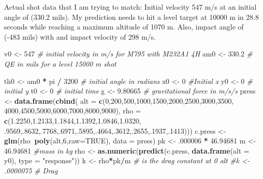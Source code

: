 \documentclass[
]{article}
\newenvironment{Shaded}{\begin{snugshade}}{\end{snugshade}}
\newcommand{\CommentTok}[1]{\textcolor[rgb]{0.56,0.35,0.01}{\textit{#1}}}
\newcommand{\DataTypeTok}[1]{\textcolor[rgb]{0.13,0.29,0.53}{#1}}
\newcommand{\DecValTok}[1]{\textcolor[rgb]{0.00,0.00,0.81}{#1}}
\newcommand{\FloatTok}[1]{\textcolor[rgb]{0.00,0.00,0.81}{#1}}
\newcommand{\KeywordTok}[1]{\textcolor[rgb]{0.13,0.29,0.53}{\textbf{#1}}}
\newcommand{\NormalTok}[1]{#1}
\newcommand{\OperatorTok}[1]{\textcolor[rgb]{0.81,0.36,0.00}{\textbf{#1}}}
\newcommand{\OtherTok}[1]{\textcolor[rgb]{0.56,0.35,0.01}{#1}}
\newcommand{\StringTok}[1]{\textcolor[rgb]{0.31,0.60,0.02}{#1}}
\begin{document}
Actual shot data that I am trying to match: Initial velocity 547 m/s at
an initial angle of (330.2 mils). My prediction needs to hit a level
target at 10000 m in 28.8 seconds while reaching a maximum altitude of
1070 m. Also, impact angle of (-483 mils) with and impact velocity of
298 m/s.

\begin{Shaded}
\begin{Highlighting}[]
\NormalTok{v0 <-}\StringTok{ }\DecValTok{547} \CommentTok{# initial velocity in m/s for M795 with M232A1 4H}
\NormalTok{am0 <-}\StringTok{ }\FloatTok{330.2} \CommentTok{# QE in mils for a level 15000 m shot}

\NormalTok{th0 <-}\StringTok{ }\NormalTok{am0 }\OperatorTok{*}\StringTok{ }\NormalTok{pi }\OperatorTok{/}\StringTok{ }\DecValTok{3200} \CommentTok{# initial angle in radians}
\NormalTok{x0 <-}\StringTok{ }\DecValTok{0} \CommentTok{#Initial x}
\NormalTok{y0 <-}\StringTok{ }\DecValTok{0} \CommentTok{# initial y}
\NormalTok{t0 <-}\StringTok{ }\DecValTok{0} \CommentTok{# initial time}
\NormalTok{g <-}\StringTok{ }\FloatTok{9.80665} \CommentTok{# gravitational force in m/s/s}
\NormalTok{press <-}\StringTok{ }\KeywordTok{data.frame}\NormalTok{(}\KeywordTok{cbind}\NormalTok{(}
  \DataTypeTok{alt =} \KeywordTok{c}\NormalTok{(}\DecValTok{0}\NormalTok{,}\DecValTok{200}\NormalTok{,}\DecValTok{500}\NormalTok{,}\DecValTok{1000}\NormalTok{,}\DecValTok{1500}\NormalTok{,}\DecValTok{2000}\NormalTok{,}\DecValTok{2500}\NormalTok{,}\DecValTok{3000}\NormalTok{,}\DecValTok{3500}\NormalTok{,}
          \DecValTok{4000}\NormalTok{,}\DecValTok{4500}\NormalTok{,}\DecValTok{5000}\NormalTok{,}\DecValTok{6000}\NormalTok{,}\DecValTok{7000}\NormalTok{,}\DecValTok{8000}\NormalTok{,}\DecValTok{9000}\NormalTok{),}
  \DataTypeTok{rho =} \KeywordTok{c}\NormalTok{(}\FloatTok{1.2250}\NormalTok{,}\FloatTok{1.2133}\NormalTok{,}\FloatTok{1.1844}\NormalTok{,}\FloatTok{1.1392}\NormalTok{,}\FloatTok{1.0846}\NormalTok{,}\FloatTok{1.0320}\NormalTok{,}
          \FloatTok{.9569}\NormalTok{,.}\DecValTok{8632}\NormalTok{,.}\DecValTok{7768}\NormalTok{,.}\DecValTok{6971}\NormalTok{,.}\DecValTok{5895}\NormalTok{,.}\DecValTok{4664}\NormalTok{,.}\DecValTok{3612}\NormalTok{,.}\DecValTok{2655}\NormalTok{,.}\DecValTok{1937}\NormalTok{,.}\DecValTok{1413}\NormalTok{)))}
\NormalTok{c.press <-}\StringTok{ }\KeywordTok{glm}\NormalTok{(rho}\OperatorTok{~}\KeywordTok{poly}\NormalTok{(alt,}\DecValTok{6}\NormalTok{,}\DataTypeTok{raw=}\OtherTok{TRUE}\NormalTok{), }\DataTypeTok{data =}\NormalTok{ press)}
\NormalTok{pk <-}\StringTok{ }\FloatTok{.000006} \OperatorTok{*}\StringTok{ }\FloatTok{46.94681}
\NormalTok{m <-}\StringTok{ }\FloatTok{46.94681} \CommentTok{#mass in kg}
\NormalTok{rho <-}\StringTok{ }\KeywordTok{as.numeric}\NormalTok{(}\KeywordTok{predict}\NormalTok{(c.press, }\KeywordTok{data.frame}\NormalTok{(}\DataTypeTok{alt =}\NormalTok{ y0), }\DataTypeTok{type =} \StringTok{"response"}\NormalTok{))}
\NormalTok{k <-}\StringTok{ }\NormalTok{rho}\OperatorTok{*}\NormalTok{pk}\OperatorTok{/}\NormalTok{m }\CommentTok{# is the drag constant at 0 alt}
\CommentTok{#k <- .0000075 # Drag}



\end{Highlighting}
\end{Shaded}
\end{document}
